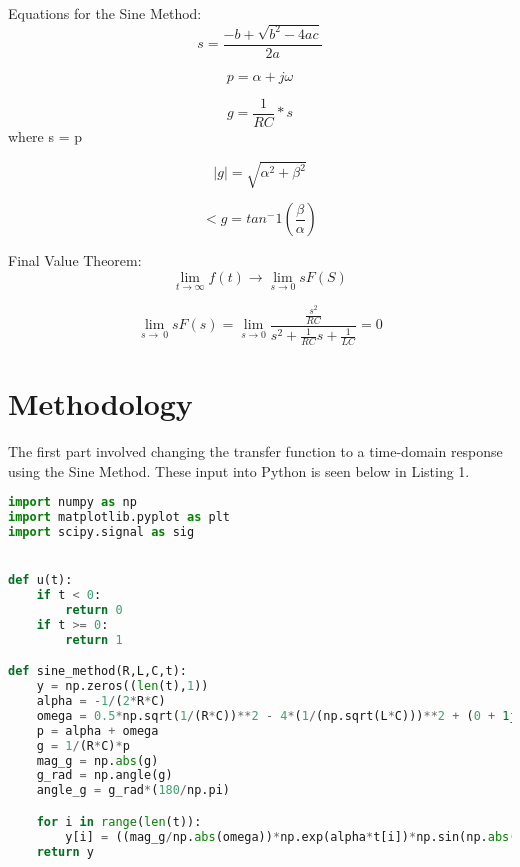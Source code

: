 \documentclass[12pt]{report}
\begin{document}
Equations for the  Sine  Method:
\begin{equation}
    s = \frac{-b+\sqrt{b^2 - 4ac}}{2a}
\end{equation}

\begin{equation}
    p = \alpha + j\omega
\end{equation}

\begin{equation}
    g = \frac{1}{RC} * s 
\end{equation}
where s = p

\begin{equation}
    |g| = \sqrt{\alpha ^ 2 + \beta ^ 2}
\end{equation}

\begin{equation}
    <g = tan^-1 (\frac{\beta}{\alpha})
\end{equation}

Final Value Theorem:
\begin{equation}
    \lim_{t\to\infty} f(t) \xrightarrow{} \lim_{s\to 0}sF(S)
\end{equation}

\begin{equation}
    \lim_{s\to\ 0} sF(s) = \lim_{s\to 0} \frac{\frac{s^2}{RC}}{s^2 + \frac{1}{RC}s + \frac{1}{LC}} = 0
\end{equation}

\section{Methodology}
The first part involved changing the transfer function to a time-domain response using the Sine Method. These input into Python is seen below in Listing 1.
\begin{lstlisting}[language=Python, caption=Hand-calculated response of the transfer function using the Sine Method]
import numpy as np
import matplotlib.pyplot as plt
import scipy.signal as sig


def u(t):
    if t < 0:
        return 0
    if t >= 0:
        return 1

def sine_method(R,L,C,t):
    y = np.zeros((len(t),1))
    alpha = -1/(2*R*C)
    omega = 0.5*np.sqrt(1/(R*C))**2 - 4*(1/(np.sqrt(L*C)))**2 + (0 + 1j)
    p = alpha + omega
    g = 1/(R*C)*p
    mag_g = np.abs(g)
    g_rad = np.angle(g)
    angle_g = g_rad*(180/np.pi)

    for i in range(len(t)):
        y[i] = ((mag_g/np.abs(omega))*np.exp(alpha*t[i])*np.sin(np.abs(omega)*t[i] + g_rad))*u(t[i])
    return y

\end{lstlisting}
\end{document}
